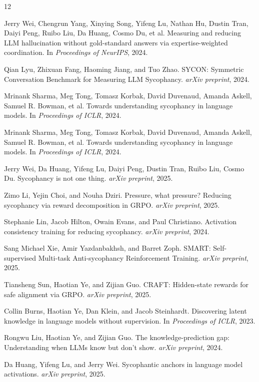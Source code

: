 \documentclass[11pt,a4paper]{article}
\begin{document}
\begin{thebibliography}{12}

Jerry Wei, Chengrun Yang, Xinying Song, Yifeng Lu, Nathan Hu, Dustin Tran, Daiyi Peng, Ruibo Liu, Da Huang, Cosmo Du, et al.
Measuring and reducing LLM hallucination without gold-standard answers via expertise-weighted coordination.
In \emph{Proceedings of NeurIPS}, 2024.

Qian Lyu, Zhixuan Fang, Haoming Jiang, and Tuo Zhao.
SYCON: Symmetric Conversation Benchmark for Measuring LLM Sycophancy.
\emph{arXiv preprint}, 2024.

Mrinank Sharma, Meg Tong, Tomasz Korbak, David Duvenaud, Amanda Askell, Samuel R. Bowman, et al.
Towards understanding sycophancy in language models.
In \emph{Proceedings of ICLR}, 2024.

Mrinank Sharma, Meg Tong, Tomasz Korbak, David Duvenaud, Amanda Askell, Samuel R. Bowman, et al.
Towards understanding sycophancy in language models.
In \emph{Proceedings of ICLR}, 2024.

Jerry Wei, Da Huang, Yifeng Lu, Daiyi Peng, Dustin Tran, Ruibo Liu, Cosmo Du.
Sycophancy is not one thing.
\emph{arXiv preprint}, 2025.

Zimo Li, Yejin Choi, and Nouha Dziri.
Pressure, what pressure? Reducing sycophancy via reward decomposition in GRPO.
\emph{arXiv preprint}, 2025.

Stephanie Lin, Jacob Hilton, Owain Evans, and Paul Christiano.
Activation consistency training for reducing sycophancy.
\emph{arXiv preprint}, 2024.

Sang Michael Xie, Amir Yazdanbakhsh, and Barret Zoph.
SMART: Self-supervised Multi-task Anti-sycophancy Reinforcement Training.
\emph{arXiv preprint}, 2025.

Tiansheng Sun, Haotian Ye, and Zijian Guo.
CRAFT: Hidden-state rewards for safe alignment via GRPO.
\emph{arXiv preprint}, 2025.

Collin Burns, Haotian Ye, Dan Klein, and Jacob Steinhardt.
Discovering latent knowledge in language models without supervision.
In \emph{Proceedings of ICLR}, 2023.

Rongwu Liu, Haotian Ye, and Zijian Guo.
The knowledge-prediction gap: Understanding when LLMs know but don't show.
\emph{arXiv preprint}, 2024.

Da Huang, Yifeng Lu, and Jerry Wei.
Sycophantic anchors in language model activations.
\emph{arXiv preprint}, 2025.

\end{thebibliography}
\end{document}
